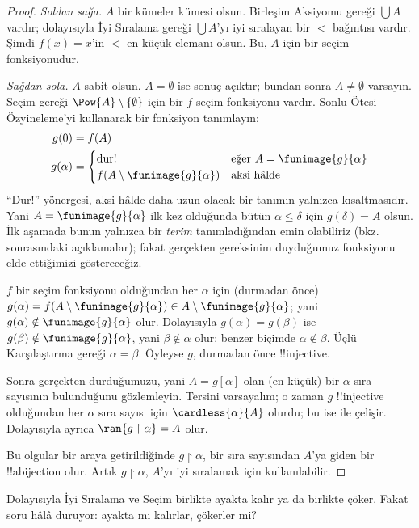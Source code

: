 \documentclass[../../../include/open-logic-section]{subfiles}
\begin{document}
\begin{proof}
\emph{Soldan sağa.} $A$ bir kümeler kümesi olsun. Birleşim Aksiyomu
gereği $\bigcup A$ vardır; dolayısıyla İyi Sıralama gereği
$\bigcup A$'yı iyi sıralayan bir $<$ bağıntısı vardır. Şimdi
$f(x)=\text{$x$'in $<$-en küçük elemanı}$ olsun. Bu, $A$ için bir seçim
fonksiyonudur.

\emph{Sağdan sola.} $A$ sabit olsun. $A=\emptyset$ ise sonuç açıktır;
bundan sonra $A\neq\emptyset$ varsayın. Seçim gereği
$\Pow{A}\setminus\{\emptyset\}$ için bir $f$ seçim fonksiyonu vardır.
Sonlu Ötesi Özyineleme'yi kullanarak bir fonksiyon tanımlayın:
\begin{align*}
	g(0) &= f(A)\\
	g(\alpha) &=
		\begin{cases}
			\text{dur!{}} &\text{eğer }A = \funimage{g}{\alpha}\\
			f(A \setminus \funimage{g}{\alpha}) & \text{aksi hâlde}\\	
		\end{cases}
\end{align*}
``Dur!'' yönergesi, aksi hâlde daha uzun olacak bir tanımın yalnızca
kısaltmasıdır. Yani $A=\funimage{g}{\alpha}$ ilk kez olduğunda bütün
$\alpha\leq\delta$ için $g(\delta)=A$ olsun. İlk aşamada bunun yalnızca
bir \emph{terim} tanımladığından emin olabiliriz (bkz.
 sonrasındaki
açıklamalar); fakat gerçekten gereksinim duyduğumuz fonksiyonu elde
ettiğimizi göstereceğiz.

$f$ bir seçim fonksiyonu olduğundan her $\alpha$ için (durmadan önce)
$g(\alpha)=f(A\setminus\funimage{g}{\alpha})\in
A\setminus\funimage{g}{\alpha}$; yani
$g(\alpha)\notin\funimage{g}{\alpha}$ olur. Dolayısıyla
$g(\alpha)=g(\beta)$ ise
$g(\beta)\notin\funimage{g}{\alpha}$, yani $\beta\notin\alpha$ olur;
benzer biçimde $\alpha\notin\beta$. Üçlü Karşılaştırma gereği
$\alpha=\beta$. Öyleyse $g$, durmadan önce !!{injective}.

Sonra gerçekten durduğumuzu, yani $A=g[\alpha]$ olan (en küçük) bir
$\alpha$ sıra sayısının bulunduğunu gözlemleyin. Tersini varsayalım;
o zaman $g$ !!{injective} olduğundan her $\alpha$ sıra sayısı için
$\cardless{\alpha}{A}$ olurdu; bu ise  ile
çelişir. Dolayısıyla ayrıca $\ran{g\restriction\alpha}=A$ olur.

Bu olgular bir araya getirildiğinde $g\restriction\alpha$, bir sıra
sayısından $A$'ya giden bir !!a{bijection} olur. Artık
$g\restriction\alpha$, $A$'yı iyi sıralamak için kullanılabilir.
\end{proof}

Dolayısıyla İyi Sıralama ve Seçim birlikte ayakta kalır ya da birlikte
çöker. Fakat soru hâlâ duruyor: ayakta mı kalırlar, çökerler mi?
\end{document}
